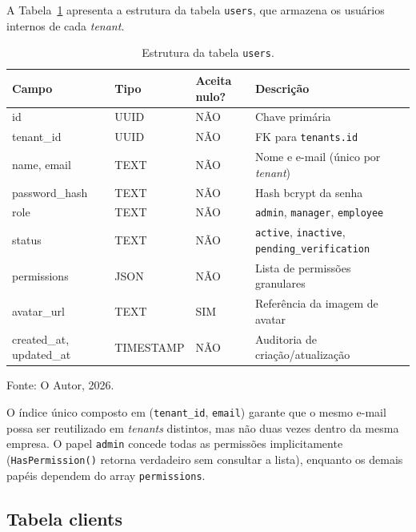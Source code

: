 A Tabela~\ref{tab:tabela-users} apresenta a estrutura da tabela \texttt{users}, que armazena os usuários internos de cada \textit{tenant}.

\begin{table}[H]
  \centering
  \caption{Estrutura da tabela \texttt{users}.}
  \label{tab:tabela-users}
  \begin{tabular}{p{3.1cm}p{2.3cm}p{1.6cm}p{5.7cm}}
    \hline
    \textbf{Campo} & \textbf{Tipo} & \textbf{Aceita nulo?} & \textbf{Descrição} \\
    \hline
    id & UUID & NÃO & Chave primária \\
    tenant\_id & UUID & NÃO & FK para \texttt{tenants.id} \\
    name, email & TEXT & NÃO & Nome e e-mail (único por \textit{tenant}) \\
    password\_hash & TEXT & NÃO & Hash bcrypt da senha \\
    role & TEXT & NÃO & \texttt{admin}, \texttt{manager}, \texttt{employee} \\
    status & TEXT & NÃO & \texttt{active}, \texttt{inactive}, \texttt{pending\_verification} \\
    permissions & JSON & NÃO & Lista de permissões granulares \\
    avatar\_url & TEXT & SIM & Referência da imagem de avatar \\
    created\_at, updated\_at & TIMESTAMP & NÃO & Auditoria de criação/atualização \\
    \hline
  \end{tabular}
  \begin{minipage}{0.95\textwidth}
    \vspace{0.3em}
    {\small Fonte: O Autor, 2026.}
  \end{minipage}
\end{table}

O índice único composto em (\texttt{tenant\_id}, \texttt{email}) garante que o mesmo e-mail possa ser reutilizado em \textit{tenants} distintos, mas não duas vezes dentro da mesma empresa. O papel \texttt{admin} concede todas as permissões implicitamente (\texttt{HasPermission()} retorna verdadeiro sem consultar a lista), enquanto os demais papéis dependem do array \texttt{permissions}.

\subsection{Tabela clients}
\label{sec:tabela-clients}

